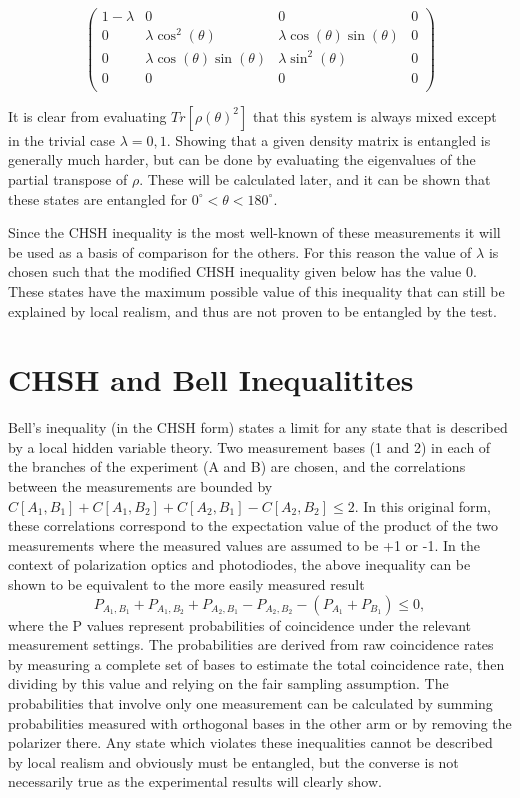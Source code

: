 \documentclass[11pt]{article}
\begin{document}
\[ \left( \begin{array}{cccc}
1 - \lambda	& 0										& 0										& 0 \\
0			& \lambda\cos ^2 (\theta)				& \lambda\cos (\theta) \sin (\theta)	& 0 \\
0			& \lambda\cos (\theta) \sin (\theta)	& \lambda\sin ^2 (\theta)				& 0 \\ 
0			& 0										& 0										& 0 \\
\end{array} \right) \]

It is clear from evaluating \(Tr[\rho(\theta)^2]\) that this system is always mixed except in the trivial
case \(\lambda = 0, 1\).  Showing that a given density matrix is entangled is generally much harder, but
can be done by evaluating the eigenvalues of the partial transpose of \(\rho\)\cite{horodecki96}.  
These will be calculated later, and it can be shown that these states are entangled 
for \(0^{\circ} < \theta < 180^{\circ}.\)

Since the CHSH inequality is the most well-known of these measurements it will be used as a basis
of comparison for the others.  For this reason the value of \( \lambda \) is chosen such that the modified CHSH 
inequality given below has the value 0. These states have the maximum possible value of this inequality 
that can still be explained by local realism, and thus are not proven to be entangled by the test.

\section{CHSH and Bell Inequalitites}
Bell's inequality (in the CHSH form) states a limit for any state that is described by a local hidden variable
theory. Two measurement bases (1 and 2) in each of the branches of the experiment (A and B) are chosen, and the 
correlations between the measurements are bounded by 
\(C[A_1, B_1] + C[A_1, B_2] + C[A_2, B_1] - C[A_2, B_2] \leq 2\).  
In this original form, these correlations correspond to the expectation value of the product of the two 
measurements where the measured values are assumed to be +1 or -1.  In the context of polarization
optics and photodiodes, the above inequality can be shown to be equivalent to the more easily measured result
\[P_{A_1,B_1} + P_{A_1,B_2} + P_{A_2,B_1} - P_{A_2,B_2} - (P_{A_1} + P_{B_1}) \leq 0,\] where the P values
represent probabilities of coincidence under the relevant measurement settings.  The probabilities are
derived from raw coincidence rates by measuring a complete set of bases to estimate the total coincidence
rate, then dividing by this value and relying on the fair sampling assumption\cite{clauser69}.  The
probabilities that involve only one measurement can be calculated by summing probabilities
measured with orthogonal bases in the other arm or by removing the polarizer there.  Any state
which violates these inequalities cannot be described by local realism and obviously must be entangled, but
the converse is not necessarily true as the experimental results will clearly show.
\end{document}
